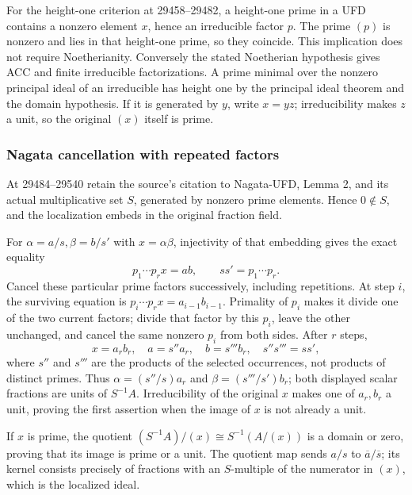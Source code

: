 For the height-one criterion at 29458--29482, a height-one prime in a UFD contains a nonzero element \(x\), hence an irreducible factor \(p\). The prime \((p)\) is nonzero and lies in that height-one prime, so they coincide. This implication does not require Noetherianity. Conversely the stated Noetherian hypothesis gives ACC and finite irreducible factorizations. A prime minimal over the nonzero principal ideal of an irreducible has height one by the principal ideal theorem and the domain hypothesis. If it is generated by \(y\), write \(x=yz\); irreducibility makes \(z\) a unit, so the original \((x)\) itself is prime.

\subsubsection{Nagata cancellation with repeated factors}\label{nagata-cancellation-with-repeated-factors}

At 29484--29540 retain the source's citation to Nagata-UFD, Lemma 2, and its actual multiplicative set \(S\), generated by nonzero prime elements. Hence \(0\notin S\), and the localization embeds in the original fraction field.

For \(\alpha=a/s,\beta=b/s'\) with \(x=\alpha\beta\), injectivity of that embedding gives the exact equality \[
 p_1\cdots p_r x=ab,\qquad ss'=p_1\cdots p_r.
\] Cancel these particular prime factors successively, including repetitions. At step \(i\), the surviving equation is \(p_i\cdots p_r x=a_{i-1}b_{i-1}\). Primality of \(p_i\) makes it divide one of the two current factors; divide that factor by this \(p_i\), leave the other unchanged, and cancel the same nonzero \(p_i\) from both sides. After \(r\) steps, \[
 x=a_r b_r,\quad a=s''a_r,\quad b=s'''b_r,\quad s''s'''=ss',
\] where \(s''\) and \(s'''\) are the products of the selected occurrences, not products of distinct primes. Thus \(\alpha=(s''/s)a_r\) and \(\beta=(s'''/s')b_r\); both displayed scalar fractions are units of \(S^{-1}A\). Irreducibility of the original \(x\) makes one of \(a_r,b_r\) a unit, proving the first assertion when the image of \(x\) is not already a unit.

If \(x\) is prime, the quotient \((S^{-1}A)/(x)\cong S^{-1}(A/(x))\) is a domain or zero, proving that its image is prime or a unit. The quotient map sends \(a/s\) to \(\overline a/\overline s\); its kernel consists precisely of fractions with an \(S\)-multiple of the numerator in \((x)\), which is the localized ideal.

